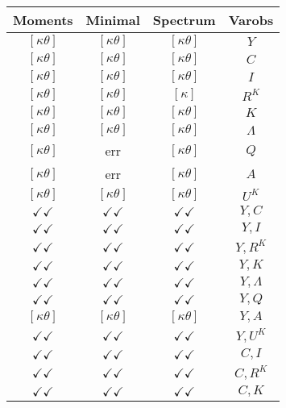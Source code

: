 \documentclass[a4paper,10pt]{article}
\begin{document}
\centering
\begin{longtable}{|c|c|c|c|}
\hline
Moments & Minimal & Spectrum & Varobs \\
\hline
$[\kappa \theta ]$ & $[\kappa \theta ]$ & $[\kappa \theta ]$ & ${Y}$ \\
\hline
$[\kappa \theta ]$ & $[\kappa \theta ]$ & $[\kappa \theta ]$ & ${C}$ \\
\hline
$[\kappa \theta ]$ & $[\kappa \theta ]$ & $[\kappa \theta ]$ & ${I}$ \\
\hline
$[\kappa \theta ]$ & $[\kappa \theta ]$ & $[\kappa ]$ & ${R^{K}}$ \\
\hline
$[\kappa \theta ]$ & $[\kappa \theta ]$ & $[\kappa \theta ]$ & ${K}$ \\
\hline
$[\kappa \theta ]$ & $[\kappa \theta ]$ & $[\kappa \theta ]$ & ${\Lambda}$ \\
\hline
$[\kappa \theta ]$ & err & $[\kappa \theta ]$ & ${Q}$ \\
\hline
$[\kappa \theta ]$ & err & $[\kappa \theta ]$ & ${A}$ \\
\hline
$[\kappa \theta ]$ & $[\kappa \theta ]$ & $[\kappa \theta ]$ & ${U^K}$ \\
\hline
$\checkmark\checkmark$ & $\checkmark\checkmark$ & $\checkmark\checkmark$ & ${Y},{C}$ \\
\hline
$\checkmark\checkmark$ & $\checkmark\checkmark$ & $\checkmark\checkmark$ & ${Y},{I}$ \\
\hline
$\checkmark\checkmark$ & $\checkmark\checkmark$ & $\checkmark\checkmark$ & ${Y},{R^{K}}$ \\
\hline
$\checkmark\checkmark$ & $\checkmark\checkmark$ & $\checkmark\checkmark$ & ${Y},{K}$ \\
\hline
$\checkmark\checkmark$ & $\checkmark\checkmark$ & $\checkmark\checkmark$ & ${Y},{\Lambda}$ \\
\hline
$\checkmark\checkmark$ & $\checkmark\checkmark$ & $\checkmark\checkmark$ & ${Y},{Q}$ \\
\hline
$[\kappa \theta ]$ & $[\kappa \theta ]$ & $[\kappa \theta ]$ & ${Y},{A}$ \\
\hline
$\checkmark\checkmark$ & $\checkmark\checkmark$ & $\checkmark\checkmark$ & ${Y},{U^K}$ \\
\hline
$\checkmark\checkmark$ & $\checkmark\checkmark$ & $\checkmark\checkmark$ & ${C},{I}$ \\
\hline
$\checkmark\checkmark$ & $\checkmark\checkmark$ & $\checkmark\checkmark$ & ${C},{R^{K}}$ \\
\hline
$\checkmark\checkmark$ & $\checkmark\checkmark$ & $\checkmark\checkmark$ & ${C},{K}$ \\

\end{longtable}
\end{document}
